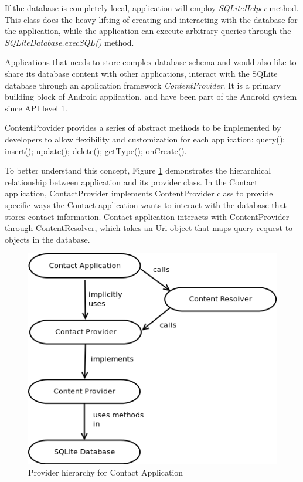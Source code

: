 If the database is completely local, application will employ \textit{SQLiteHelper} method. This class does the heavy lifting of creating and interacting with the database for the application, while the application can execute arbitrary queries through the \textit{SQLiteDatabase.execSQL()} method.

Applications that needs to store complex database schema and would also like to share its database content with other applications, interact with the SQLite database through an application framework \textit{ContentProvider}. It is a primary building block of Android application, and have been part of the Android system since API level 1. 

ContentProvider provides a series of abstract methods to be implemented by developers to allow flexibility and customization for each application: query(); insert(); update(); delete(); getType(); onCreate().

To better understand this concept, Figure \ref{FigContentProvider} demonstrates the hierarchical relationship between application and its provider class. In the Contact application, ContactProvider implements ContentProvider class to provide specific ways the Contact application wants to interact with the database that stores contact information. Contact application interacts with ContentProvider through ContentResolver, which takes an Uri object that maps query request to objects in the database.

\begin{figure}[h]
  \centering
  \includegraphics[scale=0.65]{./Figs/contact_provider.png}
  \caption
  {Provider hierarchy for Contact Application}
  \label{FigContentProvider}
\end{figure}

